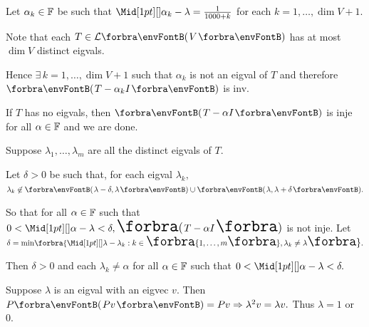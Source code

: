 \documentclass[a4paper, 11pt, UTF8]{article}
\begin{document}
\begin{large}
\par\quad
Let $\alpha_k\in{\mathbb{F}}$ be such that $\aMid{\alpha_k-\lambda}=\frac{1}{1000+k}$ for each $k=1,\dots,\dim V+1.$\par\vspace{2pt}\quad
Note that each $T\in\Lm{V}$ has at most $\dim V$ distinct eigvals.\par\quad
Hence $\exists\,k=1,\dots,\dim V+1$ such that $\alpha_k$ is not an eigval of $T$ and therefore $\Par{T-\alpha_k I}$ is inv.\PfEnd
\SepLine[0pt][\Blind{\BulletPointX} ]

\par\quad
If $T$ has no eigvals, then $\Par{T-\alpha I}$ is inje for all $\alpha\in{\mathbb{F}}$ and we are done.\par\quad
Suppose $\lambda_1,\dots,\lambda_m$ are all the distinct eigvals of $T.$\par\quad
Let $\delta>0$ be such that, for each eigval $\lambda_k,$ $\lambda_k\not\in\Par{\lambda-\delta,\lambda}\cup \Par{\lambda,\lambda+\delta}.$\par\quad
So that for all $\alpha\in{\mathbb{F}}$ such that $0<\aMid{\alpha-\lambda}<\delta,\Par{T-\alpha I}$ is not inje.\PfEnd\vspace{4pt}\quad
\Or Let $\delta=\min\!\Bra{\aMid{\lambda-\lambda_k}:k\in\envFontSmall\Bra{1,\dots,m}\envFontDefault,\lambda_k\neq\lambda}.$\par\quad
Then $\delta>0$ and each $\lambda_k\neq\alpha$  for all $\alpha\in{\mathbb{F}}$ such that $0<\aMid{\alpha-\lambda}<\delta.$\PfEnd
\SepLine

Suppose $\lambda$ is an eigval with an eigvec $v.$ Then $P\Par{Pv}=Pv\Rightarrow\lambda^2 v=\lambda v.$ Thus $\lambda=1$ or $0.$\PfEnd
\SepLine


\end{large}
\end{document}
